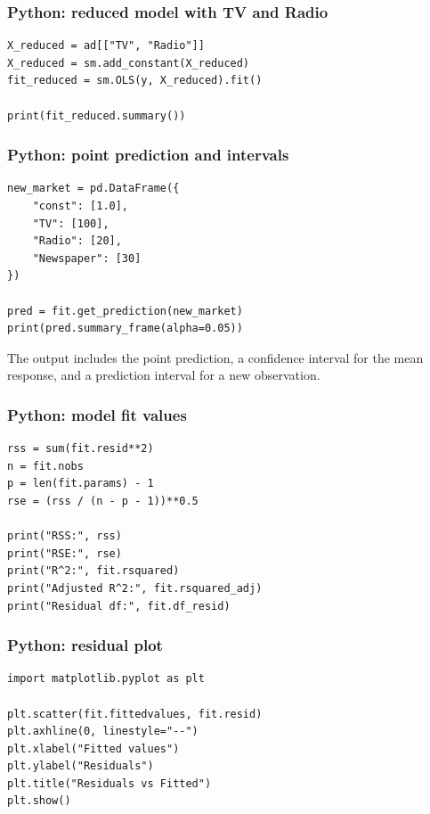 \subsubsection*{Python: reduced model with TV and Radio}

\begin{verbatim}
X_reduced = ad[["TV", "Radio"]]
X_reduced = sm.add_constant(X_reduced)
fit_reduced = sm.OLS(y, X_reduced).fit()

print(fit_reduced.summary())
\end{verbatim}

\subsubsection*{Python: point prediction and intervals}

\begin{verbatim}
new_market = pd.DataFrame({
    "const": [1.0],
    "TV": [100],
    "Radio": [20],
    "Newspaper": [30]
})

pred = fit.get_prediction(new_market)
print(pred.summary_frame(alpha=0.05))
\end{verbatim}

The output includes the point prediction, a confidence interval for the mean response, and a prediction interval for a new observation.

\subsubsection*{Python: model fit values}

\begin{verbatim}
rss = sum(fit.resid**2)
n = fit.nobs
p = len(fit.params) - 1
rse = (rss / (n - p - 1))**0.5

print("RSS:", rss)
print("RSE:", rse)
print("R^2:", fit.rsquared)
print("Adjusted R^2:", fit.rsquared_adj)
print("Residual df:", fit.df_resid)
\end{verbatim}

\subsubsection*{Python: residual plot}

\begin{verbatim}
import matplotlib.pyplot as plt

plt.scatter(fit.fittedvalues, fit.resid)
plt.axhline(0, linestyle="--")
plt.xlabel("Fitted values")
plt.ylabel("Residuals")
plt.title("Residuals vs Fitted")
plt.show()
\end{verbatim}

